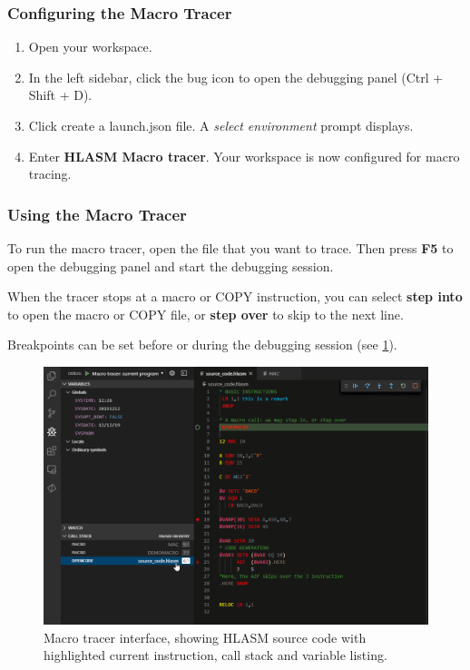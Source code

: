 \subsubsection{Configuring the Macro Tracer}

\begin{enumerate}
	\item Open your workspace.
	\item In the left sidebar, click the bug icon to open the debugging panel (Ctrl + Shift + D).
	\item Click create a launch.json file. A \emph{select environment} prompt displays.
	\item Enter \textbf{HLASM Macro tracer}. Your workspace is now configured for macro tracing.
\end{enumerate}

\subsubsection{Using the Macro Tracer}

To run the macro tracer, open the file that you want to trace. Then press \textbf{F5} to open the debugging panel and start the debugging session.

When the tracer stops at a macro or COPY instruction, you can select \textbf{step into} to open the macro or COPY file, or \textbf{step over} to skip to the next line.

Breakpoints can be set before or during the debugging session (see \cref{fig:trac}).

\begin{figure}
	\centering
	\includegraphics[width=0.9\linewidth]{img/tracer/tracer-175}
	\caption{Macro tracer interface, showing HLASM source code with highlighted current instruction, call stack and variable listing.}
	\label{fig:trac}
\end{figure}
